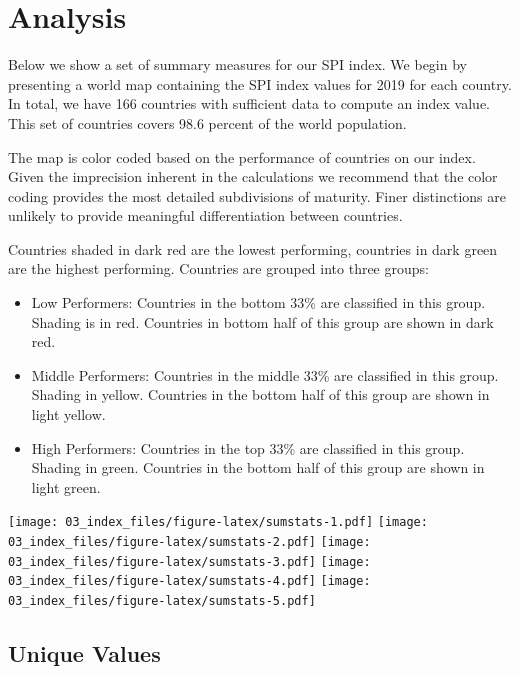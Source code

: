 \documentclass[
]{article}
\providecommand{\tightlist}{%
  \setlength{\itemsep}{0pt}\setlength{\parskip}{0pt}}
\begin{document}
\hypertarget{analysis}{%
\section{Analysis}\label{analysis}}

Below we show a set of summary measures for our SPI index. We begin by presenting a world map containing the SPI index values for 2019 for each country. In total, we have 166 countries with sufficient data to compute an index value. This set of countries covers 98.6 percent of the world population.

The map is color coded based on the performance of countries on our index. Given the imprecision inherent in the calculations we recommend that the color coding provides the most detailed subdivisions of maturity. Finer distinctions are unlikely to provide meaningful differentiation between countries.

Countries shaded in dark red are the lowest performing, countries in dark green are the highest performing. Countries are grouped into three groups:

\begin{itemize}
\tightlist
\item
  Low Performers: Countries in the bottom 33\% are classified in this group. Shading is in red. Countries in bottom half of this group are shown in dark red.\\
\item
  Middle Performers: Countries in the middle 33\% are classified in this group. Shading in yellow. Countries in the bottom half of this group are shown in light yellow.\\
\item
  High Performers: Countries in the top 33\% are classified in this group. Shading in green. Countries in the bottom half of this group are shown in light green.
\end{itemize}

\texttt{[image: 03\_index\_files/figure-latex/sumstats-1.pdf]} \texttt{[image: 03\_index\_files/figure-latex/sumstats-2.pdf]} \texttt{[image: 03\_index\_files/figure-latex/sumstats-3.pdf]} \texttt{[image: 03\_index\_files/figure-latex/sumstats-4.pdf]} \texttt{[image: 03\_index\_files/figure-latex/sumstats-5.pdf]}

\hypertarget{unique-values}{%
\subsection{Unique Values}\label{unique-values}}
\end{document}
